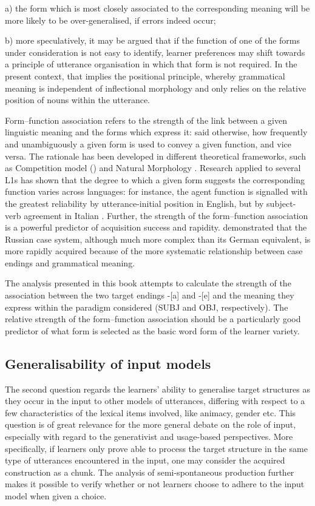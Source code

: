 a) the form which is most closely associated to the corresponding meaning will be more likely to be over-generalised, if errors indeed occur;

b) more speculatively, it may be argued that if the function of one of the forms under consideration is not easy to identify, learner preferences may shift towards a principle of utterance organisation in which that form is not required. In the present context, that implies the positional principle, whereby grammatical meaning is independent of inflectional morphology and only relies on the relative position of nouns within the utterance. 

Form–function association refers to the strength of the link between a given linguistic meaning and the forms which express it: said otherwise, how frequently and unambiguously a given form is used to convey a given function, and vice versa. The rationale has been developed in different theoretical frameworks, such as Competition model (\citealt{MacWhinneyBates1987}) and Natural Morphology \citep{Dressler1987}. Research applied to several L1s has shown that the degree to which a given form suggests the corresponding function varies across languages: for instance, the agent function is signalled with the greatest reliability by utterance-initial position in English, but by subject-verb agreement in Italian \citep{MacWhinneyEtAl1984}. Further, the strength of the form–function association is a powerful predictor of acquisition success and rapidity. \citet{KempeMacWhinney1998} demonstrated that the Russian case system, although much more complex than its German equivalent, is more rapidly acquired because of the more systematic relationship between case endings and grammatical meaning. 

The analysis presented in this book attempts to calculate the strength of the association between the two target endings -[a] and -[e] and the meaning they express within the paradigm considered (SUBJ and OBJ, respectively). The relative strength of the form–function association should be a particularly good predictor of what form is selected as the basic word form of the learner variety.

\subsection{Generalisability of input models}\label{sec:01:4.2}

The second question regards the learners’ ability to generalise target structures as they occur in the input to other models of utterances, differing with respect to a few characteristics of the lexical items involved, like animacy, gender etc. This question is of great relevance for the more general debate on the role of input, especially with regard to the generativist and usage-based perspectives. More specifically, if learners only prove able to process the target structure in the same type of utterances encountered in the input, one may consider the acquired construction as a chunk. The analysis of semi-spontaneous production further makes it possible to verify whether or not learners choose to adhere to the input model when given a choice.

